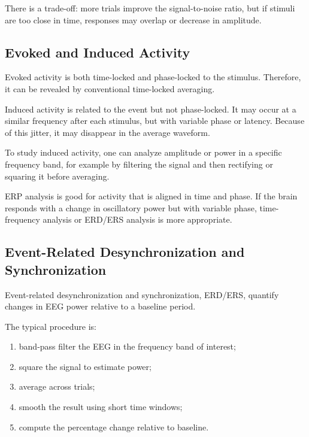\begin{authornote}
There is a trade-off: more trials improve the signal-to-noise ratio, but if stimuli are too close in time, responses may overlap or decrease in amplitude.
\end{authornote}

\subsection{Evoked and Induced Activity}

Evoked activity is both time-locked and phase-locked to the stimulus. Therefore, it can be revealed by conventional time-locked averaging.

Induced activity is related to the event but not phase-locked. It may occur at a similar frequency after each stimulus, but with variable phase or latency. Because of this jitter, it may disappear in the average waveform.

To study induced activity, one can analyze amplitude or power in a specific frequency band, for example by filtering the signal and then rectifying or squaring it before averaging.

\begin{authornote}
ERP analysis is good for activity that is aligned in time and phase. If the brain responds with a change in oscillatory power but with variable phase, time-frequency analysis or ERD/ERS analysis is more appropriate.
\end{authornote}

\subsection{Event-Related Desynchronization and Synchronization}

Event-related desynchronization and synchronization, ERD/ERS, quantify changes in EEG power relative to a baseline period.

The typical procedure is:

\begin{enumerate}[noitemsep]
    \item band-pass filter the EEG in the frequency band of interest;
    \item square the signal to estimate power;
    \item average across trials;
    \item smooth the result using short time windows;
    \item compute the percentage change relative to baseline.
\end{enumerate}

